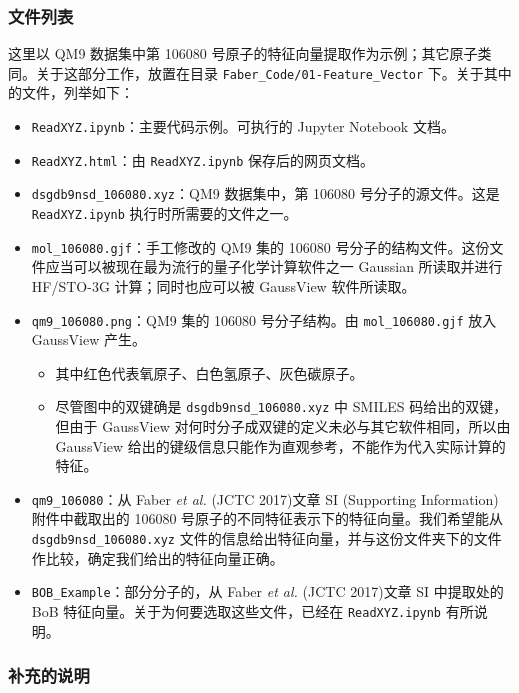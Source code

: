 \documentclass[10pt,a4paper,onecolumn]{article}
\numberwithin{equation}{section}
\begin{document}
\subsubsection{文件列表}

这里以 QM9 数据集中第 106080 号原子的特征向量提取作为示例；其它原子类同。关于这部分工作，放置在目录 \verb|Faber_Code/01-Feature_Vector| 下。关于其中的文件，列举如下：
\begin{itemize}[noitemsep]
  \item \verb|ReadXYZ.ipynb|：主要代码示例。可执行的 Jupyter Notebook 文档。
  \item \verb|ReadXYZ.html|：由 \verb|ReadXYZ.ipynb| 保存后的网页文档。
  \item \verb|dsgdb9nsd_106080.xyz|：QM9 数据集中，第 106080 号分子的源文件。这是 \verb|ReadXYZ.ipynb| 执行时所需要的文件之一。
  \item \verb|mol_106080.gjf|：手工修改的 QM9 集的 106080 号分子的结构文件。这份文件应当可以被现在最为流行的量子化学计算软件之一 Gaussian 所读取并进行 HF/STO-3G 计算；同时也应可以被 GaussView 软件所读取。
  \item \verb|qm9_106080.png|：QM9 集的 106080 号分子结构。由 \verb|mol_106080.gjf| 放入 GaussView 产生。
  \begin{itemize}[noitemsep, nolistsep]
    \item 其中红色代表氧原子、白色氢原子、灰色碳原子。
    \item 尽管图中的双键确是 \verb|dsgdb9nsd_106080.xyz| 中 SMILES 码给出的双键，但由于 GaussView 对何时分子成双键的定义未必与其它软件相同，所以由 GaussView 给出的键级信息只能作为直观参考，不能作为代入实际计算的特征。
  \end{itemize}
  \item \verb|qm9_106080|：从 Faber \emph{et al.} (JCTC 2017)\citep{Faber-Lilienfeld.JCTC.2017.13}文章 SI (Supporting Information) 附件中截取出的 106080 号原子的不同特征表示下的特征向量。我们希望能从 \verb|dsgdb9nsd_106080.xyz| 文件的信息给出特征向量，并与这份文件夹下的文件作比较，确定我们给出的特征向量正确。
  \item \verb|BOB_Example|：部分分子的，从 Faber \emph{et al.} (JCTC 2017)\citep{Faber-Lilienfeld.JCTC.2017.13}文章 SI 中提取处的 BoB 特征向量。关于为何要选取这些文件，已经在 \verb|ReadXYZ.ipynb| 有所说明。
\end{itemize}

\subsubsection{补充的说明}
\end{document}

